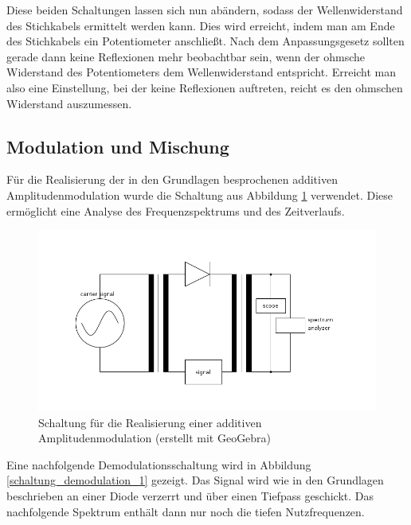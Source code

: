 	Diese beiden Schaltungen lassen sich nun abändern, sodass der Wellenwiderstand des Stichkabels ermittelt werden kann.
	Dies wird erreicht, indem man am Ende des Stichkabels ein Potentiometer anschließt.
	Nach dem Anpassungsgesetz sollten gerade dann keine Reflexionen mehr beobachtbar sein, wenn der ohmsche Widerstand des Potentiometers dem Wellenwiderstand entspricht.
	Erreicht man also eine Einstellung, bei der keine Reflexionen auftreten, reicht es den ohmschen Widerstand auszumessen.\cite{unterlagen}


\subsection{Modulation und Mischung} %
\label{sub:modulation_und_mischung}

	Für die Realisierung der in den Grundlagen besprochenen additiven Amplitudenmodulation wurde die Schaltung aus Abbildung \ref{schaltung_modulation_1} verwendet.
	Diese ermöglicht eine Analyse des Frequenzspektrums und des Zeitverlaufs.

	\begin{figure}[H]
		\center
		\includegraphics[scale = 1.0]{schaltung-modulation-01.png}
		\caption{\centering Schaltung für die Realisierung einer additiven Amplitudenmodulation \cite{unterlagen} (erstellt mit GeoGebra)}
		\label{schaltung_modulation_1}
	\end{figure}

	Eine nachfolgende Demodulationsschaltung wird in Abbildung \ref{schaltung_demodulation_1} gezeigt. 
	Das Signal wird wie in den Grundlagen beschrieben an einer Diode verzerrt und über einen Tiefpass geschickt.
	Das nachfolgende Spektrum enthält dann nur noch die tiefen Nutzfrequenzen. 

